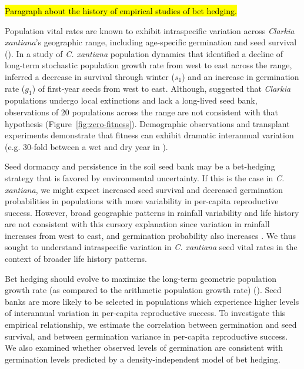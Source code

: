 \documentclass[12pt, oneside, titlepage]{article}   	%
\begin{document}
\hypertarget{bet-hedging-history}{\hl{Paragraph about the history of empirical studies of bet hedging.}}

Population vital rates are known to exhibit intraspecific variation across \textit{Clarkia xantiana}'s geographic range, including age-specific germination and seed survival (\cite{eckhart2011}). In a study of \textit{C. xantiana} population dynamics that identified a decline of long-term stochastic population growth rate from west to east across the range, \cite{eckhart2011} inferred a decrease in survival through winter ($s_1$) and an increase in germination rate ($g_1$) of first-year seeds from west to east. Although, \cite{lewis1962} suggested that \textit{Clarkia} populations undergo local extinctions and lack a long-lived seed bank, observations of 20 populations across the range are not consistent with that hypothesis (Figure~\ref{fig:zero-fitness}). Demographic observations \cite{eckhart2011} and transplant experiments demonstrate that fitness can exhibit dramatic interannual variation (e.g. 30-fold between a wet and dry year in \cite{geber2005}). 

Seed dormancy and persistence in the soil seed bank may be a bet-hedging strategy that is favored by environmental uncertainty. If this is the case in \textit{C. xantiana}, we might expect increased seed survival and decreased germination probabilities in populations with more variability in per-capita reproductive success. However, broad geographic patterns in rainfall variability and life history are not consistent with this cursory explanation since variation in rainfall increases from west to east, and germination probability also increases \cite{eckhart2011}. We thus sought to understand intraspecific variation in \textit{C. xantiana} seed vital rates in the context of broader life history patterns. 

Bet hedging should evolve to maximize the long-term geometric population growth rate (as compared to the arithmetic population growth rate) (\cite{cohen1966,cohen1968,ellner1985,ellner1985a}). Seed banks are more likely to be selected in populations which experience higher levels of interannual variation in per-capita reproductive success. To investigate this empirical relationship, we estimate the correlation between germination and seed survival, and between germination variance in per-capita reproductive success. We also examined whether observed levels of germination are consistent with germination levels predicted by a density-independent model of bet hedging. 
\end{document}
